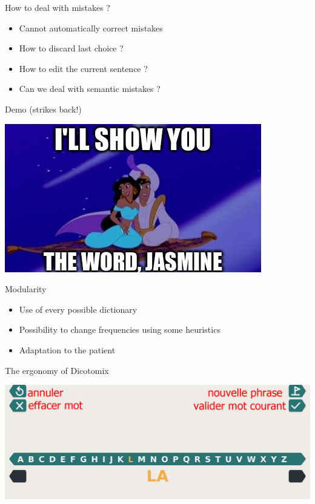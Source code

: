 \documentclass[graphics]{beamer}
\begin{document}
\begin{frame}{How to deal with mistakes ?}
	\begin{itemize}
		\item Cannot automatically correct mistakes
		\pause
		\item How to discard last choice ?
		\pause
		\item How to edit the current sentence ?
		\pause
		\item Can we deal with semantic mistakes ?
	\end{itemize}
\end{frame}

\begin{frame}{Demo (strikes back!)}
	\begin{center}
		\includegraphics[scale=0.6]{aladdin2}
	\end{center}
\end{frame}

\begin{frame}{Modularity}
	\begin{center}
		\begin{itemize}
			\item Use of every possible dictionary %
			\item Possibility to change frequencies using some heuristics
			\item Adaptation to the patient
		\end{itemize}
	\end{center}
\end{frame}



\begin{frame}{The ergonomy of Dicotomix}
	\begin{center}
		\includegraphics[scale=0.2]{vierge}
	\end{center}
\end{frame}
\end{document}
